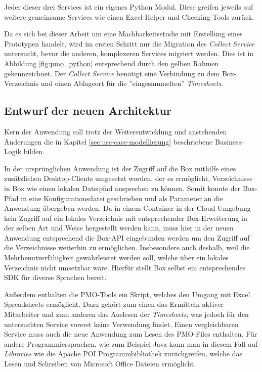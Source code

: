 Jeder dieser drei Services ist ein eigenes Python Modul. Diese greifen jeweils auf weitere gemeinsame Services wie einen Excel-Helper und Checking-Tools zurück.

Da es sich bei dieser Arbeit um eine Machbarkeitsstudie mit Erstellung eines Prototypen handelt, wird im ersten Schritt nur die Migration des \textit{Collect Service} untersucht, bevor die anderen, komplexeren Services migriert werden. Dies ist in Abbildung \ref{fig:pmo_python} entsprechend durch den gelben Rahmen gekennzeichnet. Der \textit{Collect Service} benötigt eine Verbindung zu dem \gls{Box}-Verzeichnis und einen Ablageort für die ''eingesammelten'' \textit{\glspl{Timesheet}}.
\pagebreak

\subsection{Entwurf der neuen Architektur}
Kern der Anwendung soll trotz der Weiterentwicklung und anstehenden Änderungen die in Kapitel \ref{sec:use-case-modellierung} beschriebene Business-Logik bilden.

In der ursprünglichen Anwendung ist der Zugriff auf die \gls{Box} mithilfe eines zusätzlichen Desktop-Clients umgesetzt worden, der es ermöglicht, Verzeichnisse in \gls{Box} wie einen lokalen Dateipfad ansprechen zu können. Somit konnte der Box-Pfad in eine Konfigurationsdatei geschrieben und als Parameter an die Anwendung übergeben werden. Da in einem Container in der Cloud Umgebung kein Zugriff auf ein lokales Verzeichnis mit entsprechender \gls{Box}-Erweiterung in der selben Art und Weise hergestellt werden kann, muss hier in der neuen Anwendung entsprechend die \gls{Box}-\ac{API} eingebunden werden um den Zugriff auf die Verzeichnisse weiterhin zu ermöglichen. Insbesondere auch deshalb, weil die Mehrbenutzerfähigkeit gewährleistet werden soll, welche über ein lokales Verzeichnis nicht umsetzbar wäre. Hierfür stellt \gls{Box} selbst ein entsprechendes \ac{SDK} für diverse Sprachen bereit.

Außerdem enthalten die PMO-Tools ein Skript, welches den Umgang mit Excel Spreadsheets ermöglicht. Dazu gehört zum einen das Ermitteln aktiver Mitarbeiter und zum anderen das Auslesen der \textit{\glspl{Timesheet}}, was jedoch für den untersuchten Service vorerst keine Verwendung findet. Einen vergleichbaren Service muss auch die neue Anwendung zum Lesen des PMO-Files enthalten. Für andere Programmiersprachen, wie zum Beispiel Java kann man in diesem Fall auf \textit{Libraries} wie die \gls{Apache POI} Programmbibliothek zurückgreifen, welche das Lesen und Schreiben von Microsoft Office Dateien ermöglicht.

